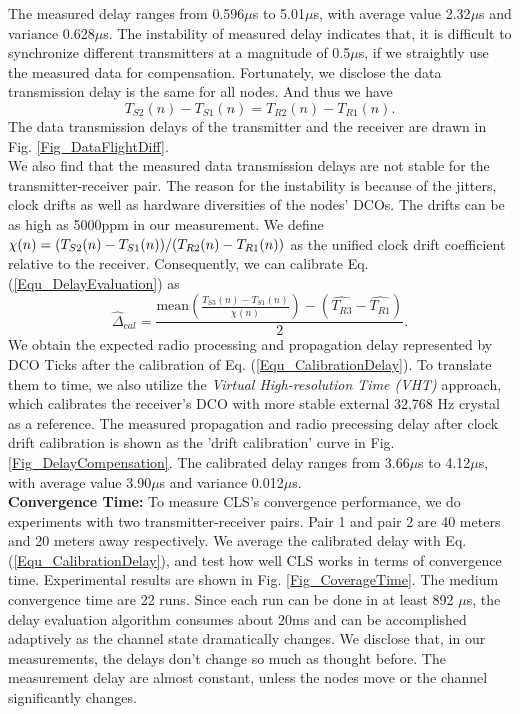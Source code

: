 \documentclass[conference]{IEEEtran}
\begin{document}
The measured delay ranges from 0.596$\mu$s to 5.01$\mu$s, with average value 2.32$\mu$s and variance 0.628$\mu$s.
The instability of measured delay indicates that, it is difficult to synchronize different transmitters at a magnitude of 0.5$\mu$s, if we straightly use the measured data for compensation.
Fortunately, we disclose the data transmission delay is the same for all nodes.
And thus we have
\begin{equation}
\label{Equ_DataTransmissionDelay}
T_{S2}(n)-T_{S1}(n)=T_{R2}(n)-T_{R1}(n).
\end{equation}
The data transmission delays of the transmitter and the receiver are drawn in Fig. \ref{Fig_DataFlightDiff}.\\
\indent We also find that the measured data transmission delays are not stable for the transmitter-receiver pair.
The reason for the instability is because of the jitters, clock drifts as well as hardware diversities of the nodes' DCOs. The drifts can be as high as 5000ppm in our measurement.
We define $\chi (n) = {{(T_{S2} (n) - T_{S1} (n))} \mathord{\left/
 {\vphantom {{(T_{S2} (n) - T_{S1} (n))} {(T_{R2} (n) - T_{R1} (n))}}} \right.
 \kern-\nulldelimiterspace} {(T_{R2} (n) - T_{R1} (n))}}$ as the unified clock drift coefficient relative to the receiver.
Consequently, we can calibrate Eq. (\ref{Equ_DelayEvaluation}) as
\begin{equation}
\label{Equ_CalibrationDelay}
\widehat{\Delta}_{cal}=\frac{\text{mean}(\frac{T_{S3}(n)-T_{S1}(n)}{\chi (n)})-(\widehat{T_{R3}}-\widehat{T_{R1}})}{2}.
\end{equation}
We obtain the expected radio processing and propagation delay represented by DCO Ticks after the calibration of Eq. (\ref{Equ_CalibrationDelay}).
To translate them to time, we also utilize the \emph{Virtual High-resolution Time (VHT)} \cite{SchmidIPSN10} approach, which calibrates the receiver's DCO with more stable external 32,768 Hz crystal as a reference.
The measured propagation and radio precessing delay after clock drift calibration is shown as the 'drift calibration' curve in Fig. \ref{Fig_DelayCompensation}.
The calibrated delay ranges from 3.66$\mu$s to 4.12$\mu$s, with average value 3.90$\mu$s and variance 0.012$\mu$s.\\
\indent \textbf{Convergence Time:} To measure CLS's convergence performance, we do experiments with two transmitter-receiver pairs.
Pair 1 and pair 2 are 40 meters and 20 meters away respectively.
We average the calibrated delay with Eq. (\ref{Equ_CalibrationDelay}), and test how well CLS works in terms of convergence time.
Experimental results are shown in Fig. \ref{Fig_CoverageTime}.
The medium convergence time are 22 runs.
Since each run can be done in at least 892 $\mu$s, the delay evaluation algorithm consumes about 20ms and can be accomplished adaptively as the channel state dramatically changes.
We disclose that, in our measurements, the delays don't change so much as thought before.
The measurement delay are almost constant, unless the nodes move or the channel significantly changes.
\end{document}
